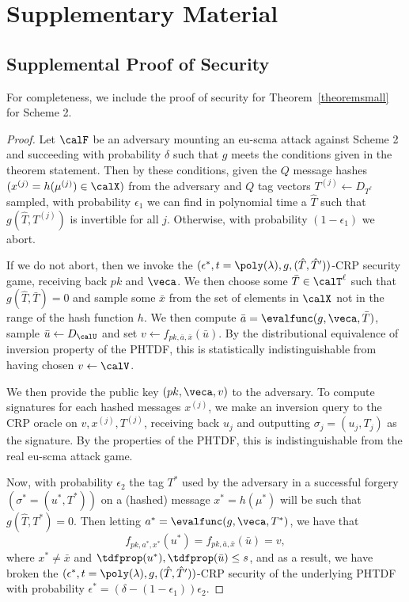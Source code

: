\section{Supplementary Material}
\label{sec:supplementary}


\subsection{Supplemental Proof of Security }
\label{sec:suppl-proof-secur}

For completeness, we include the proof of security for
Theorem~\ref{theoremsmall} for Scheme 2. 

\begin{proof}
Let $\calF$ be an adversary mounting an eu-scma attack against Scheme
2 and succeeding with probability $\delta$ such that $g$ meets the
conditions given in the theorem statement. Then by these conditions, given the $Q$ message hashes
$(x^{(j)} = h(\mu^{(j)}) \in \calX)$ from the adversary and $Q$ tag
vectors $T^{(j)} \gets D_{T^{\ell}}$ sampled, with probability
$\epsilon_1$ we can find in
polynomial time a $\hat{T}$ such that $g(\hat{T},T^{(j)})$ is
invertible for all $j$. Otherwise, with probability $(1-\epsilon_1)$
we abort. 

If we do not abort, then we invoke the $(\epsilon^*, t=\poly(\lambda),
g, (\hat{T},\hat{T}'))$-CRP security game, receiving back $pk$ and
$\veca$. We then choose some $\bar{T} \in \calT^{\ell}$ such that
$g(\hat{T},\bar{T})=0$ and sample some $\bar{x}$ from the set of elements in
$\calX$ not in the range of the hash function $h$. We then compute
$\bar{a} = \evalfunc(g,\veca,\bar{T})$, sample $\bar{u} \gets
D_{\calU}$ and set $v \gets f_{pk,\bar{a},\bar{x}}(\bar{u})$. By the
distributional equivalence of inversion property of the PHTDF, this is
statistically indistinguishable from having chosen $v \gets \calV$. 

We then provide the public key $(pk,\veca,v)$ to the adversary. To
compute signatures for each hashed messages $x^{(j)}$, we make an
inversion query to the CRP oracle on $v, x^{(j)}, T^{(j)}$, receiving
back $u_j$ and outputting $\sigma_j=(u_j,T_j)$ as the signature. By
the properties of the PHTDF, this is indistinguishable from the real
eu-scma attack game. 

Now, with probability $\epsilon_2$ the tag $T^*$ used by the adversary
in a successful forgery $(\sigma^*=(u^*,T^*))$ on a (hashed) message
$x^*=h(\mu^*)$ will be such that $g(\hat{T}, T^*)=0$. Then letting
$a^*=\evalfunc(g,\veca,T^*)$, we have that 
\[f_{pk,a^*,x^*}(u^*) = f_{pk,\bar{a},\bar{x}}(\bar{u})=v,\]
where $x^* \neq \bar{x}$ and  $\tdfprop(u^*), \tdfprop(\bar{u}) \leq
s$, and as a result, we have broken the $(\epsilon^*, t=\poly(\lambda), g, (\hat{T},\hat{T}'))$-CRP
security of the underlying PHTDF with probability $\epsilon^* =
(\delta - (1-\epsilon_1))\epsilon_2$.
\end{proof}
